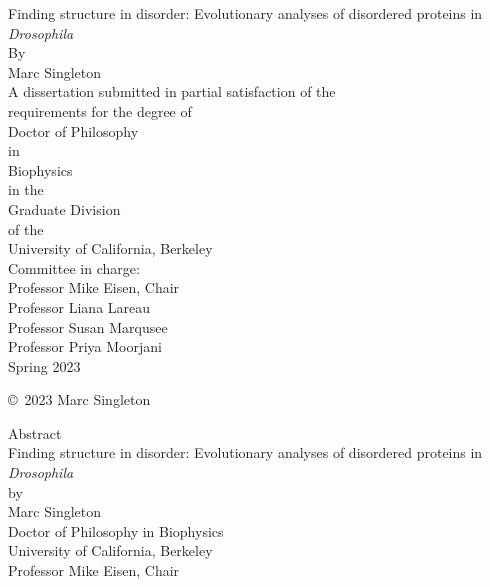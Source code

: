 \documentclass[11pt,letterpaper,oneside]{book}
\begin{document}
\begin{titlepage}
\begin{center}
    Finding structure in disorder: Evolutionary analyses of disordered proteins in \textit{Drosophila}\\
    \bigskip
    By\\
    Marc Singleton\\
    \vfill
    A dissertation submitted in partial satisfaction of the\\
    requirements for the degree of\\
    Doctor of Philosophy\\
    in\\
    Biophysics\\
    in the\\
    Graduate Division\\
    of the\\
    University of California, Berkeley\\
    \vfill
    Committee in charge:\\
    Professor Mike Eisen, Chair\\
    Professor Liana Lareau\\
    Professor Susan Marqusee\\
    Professor Priya Moorjani\\
    \bigskip
    Spring 2023\\
\end{center}
\end{titlepage}

\thispagestyle{empty}
\null  %
\vfill
\begin{center}
    \copyright \  2023 Marc Singleton
\end{center}
\clearpage

\setcounter{page}{1}  %
\begin{center}
    Abstract\\
    \bigskip
    Finding structure in disorder: Evolutionary analyses of disordered proteins in \textit{Drosophila}\\
    by\\
    Marc Singleton\\
    \bigskip
    Doctor of Philosophy in Biophysics\\
    University of California, Berkeley\\
    Professor Mike Eisen, Chair\\
    \bigskip
\end{center}
\end{document}

